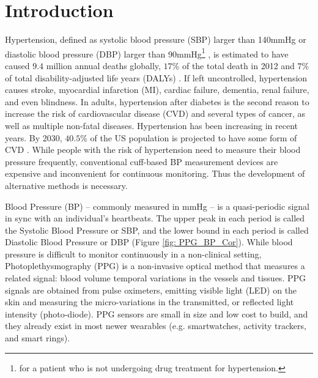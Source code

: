 \documentclass[letterpaper, 10 pt, conference]{ieeeconf}
\begin{document}
\section{Introduction}
Hypertension, defined as systolic blood pressure (SBP) larger than 140mmHg or diastolic blood pressure (DBP) larger than 90mmHg\footnote{for a patient who is not undergoing drug treatment for hypertension.} 
\cite{doi:10.1161/CIR.0000000000000558}, is estimated to have caused $9.4$ million annual deaths globally, $17$\% of the total death in 2012 and $7$\% of total disability-adjusted life years (DALYs) \cite{world2014global}. If left uncontrolled,
hypertension causes stroke, myocardial infarction (MI), cardiac failure, dementia, renal failure, and even blindness. In adults, hypertension after diabetes is the second reason to increase the risk of cardiovascular disease (CVD) and several types of cancer, as well as multiple non-fatal diseases. Hypertension has been increasing in recent years. By 2030, $40.5$\% of the US population is projected to have some form of CVD \cite{doi:10.1161/CIR.0b013e31820a55f5}.
While people with the risk of hypertension need to measure their blood pressure frequently, conventional cuff-based BP measurement devices are expensive and inconvenient for continuous monitoring. Thus the development of alternative methods is necessary.

Blood Pressure (BP) -- commonly measured in mmHg -- is a quasi-periodic signal in sync with an individual's heartbeats. The upper peak in each period is called the Systolic Blood Pressure or SBP, and the lower bound in each period is called Diastolic Blood Pressure or DBP (Figure \ref{fig: PPG_BP_Cor}). While blood pressure is difficult to monitor continuously in a non-clinical setting, Photoplethysmography (PPG) is a non-invasive optical method that measures a related signal: blood volume temporal variations in the vessels and tissues.
PPG signals are obtained from pulse oximeters, emitting visible light (LED) on the skin and measuring the micro-variations in the transmitted,
or reflected light intensity (photo-diode). PPG sensors are small in size and low cost to build, and they already exist in most newer wearables (e.g. smartwatches, activity trackers, and smart rings). 
\end{document}
